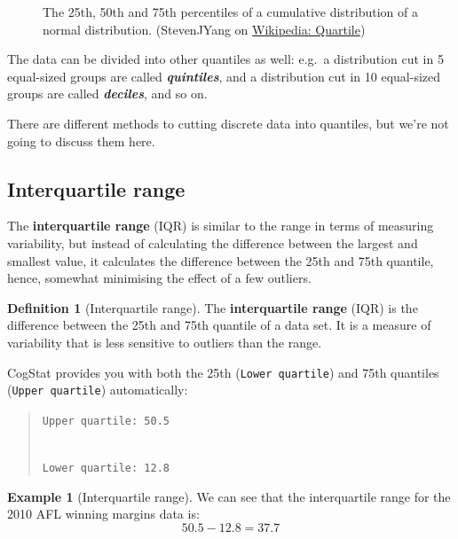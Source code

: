\documentclass[
  11pt,
]{book}
\theoremstyle{definition}
\newtheorem{definition}{Definition}[chapter]
\theoremstyle{definition}
\newtheorem{example}{Example}[chapter]
\theoremstyle{definition}
\theoremstyle{definition}
\theoremstyle{remark}
\begin{document}
\begin{callout}[Quantiles]
\begin{figure}
{}

\caption{The 25th, 50th and 75th percentiles of a cumulative distribution of a normal distribution. (StevenJYang on \href{https://en.wikipedia.org/wiki/Quartile}{Wikipedia: Quartile})}\label{fig:unnamed-chunk-18}
\end{figure}

The data can be divided into other quantiles as well: e.g.~a distribution cut in 5 equal-sized groups are called \textbf{\emph{quintiles}}, and a distribution cut in 10 equal-sized groups are called \textbf{\emph{deciles}}, and so on.

There are different methods to cutting discrete data into quantiles, but we're not going to discuss them here.

\end{callout}

\hypertarget{IQR}{%
\subsection{Interquartile range}\label{IQR}}

The \textbf{interquartile range} (IQR) is similar to the range in terms of measuring variability, but instead of calculating the difference between the largest and smallest value, it calculates the difference between the 25th and 75th quantile, hence, somewhat minimising the effect of a few outliers.

\begin{definition}[Interquartile range]
\protect\hypertarget{def:defIQR}{}\label{def:defIQR}The \textbf{interquartile range} (IQR) is the difference between the 25th and 75th quantile of a data set. It is a measure of variability that is less sensitive to outliers than the range.
\end{definition}

CogStat provides you with both the 25th (\texttt{Lower\ quartile}) and 75th quantiles (\texttt{Upper\ quartile}) automatically:

\begin{quote}
\texttt{Upper\ quartile:\ 50.5}\strut \\
\texttt{Lower\ quartile:\ 12.8}
\end{quote}

\begin{example}[Interquartile range]
\protect\hypertarget{exm:exIQR}{}\label{exm:exIQR}We can see that the interquartile range for the 2010 AFL winning margins data is:
\[
50.5 - 12.8 = \mathbf{37.7}
\]
\end{example}
\end{document}
